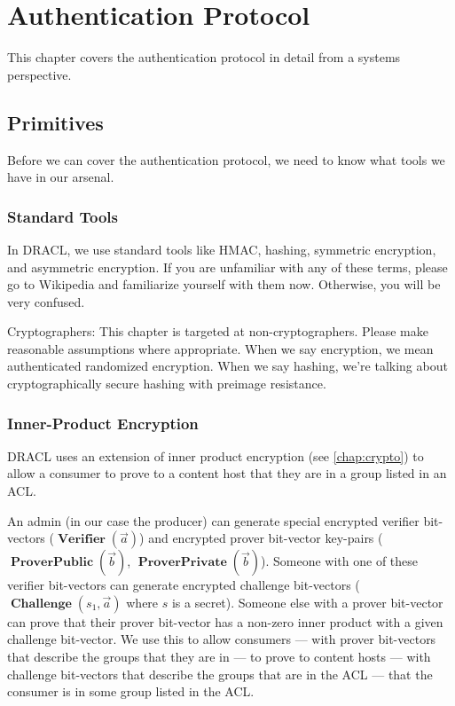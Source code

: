 \documentclass[pdftex,12pt,a4papaer,twoside,notitlepage]{report}
\DeclareMathOperator{\Vvec}{\mathbf{Verifier}}
\DeclareMathOperator{\PvecP}{\mathbf{ProverPublic}}
\DeclareMathOperator{\PvecS}{\mathbf{ProverPrivate}}
\DeclareMathOperator{\Cvec}{\mathbf{Challenge}}
\begin{document}
\chapter{Authentication Protocol}
\label{chap:auth}

\newcommand{\Vv}{\Vvec(\vec{a})}
\newcommand{\Cv}{\Cvec(s_1, \vec{a})}
\newcommand{\Pv}{\PvecP(\vec{b})}
\newcommand{\Sv}{\PvecS(\vec{b})}

This chapter covers the authentication protocol in detail from a systems
perspective.

\section{Primitives}

Before we can cover the authentication protocol, we need to know what tools we
have in our arsenal.

\subsection{Standard Tools}

In DRACL, we use standard tools like HMAC, hashing, symmetric encryption, and
asymmetric encryption. If you are unfamiliar with any of these terms, please go
to Wikipedia and familiarize yourself with them now. Otherwise, you will be very
confused.

Cryptographers: This chapter is targeted at non-cryptographers. Please make
reasonable assumptions where appropriate. When we say encryption, we mean
authenticated randomized encryption. When we say hashing, we're talking about
cryptographically secure hashing with preimage resistance.

\subsection{Inner-Product Encryption}

DRACL uses an extension of inner product encryption (see \cref{chap:crypto}) to
allow a consumer to prove to a content host that they are in a group listed in
an ACL.

An admin (in our case the producer) can generate special encrypted verifier
bit-vectors ($\Vv$) and encrypted prover bit-vector key-pairs ($\Pv$, $\Sv$).
Someone with one of these verifier bit-vectors can generate encrypted challenge
bit-vectors ($\Cv$ where $s$ is a secret). Someone else with a prover bit-vector
can prove that their prover bit-vector has a non-zero inner product with a given
challenge bit-vector. We use this to allow consumers --- with prover bit-vectors
that describe the groups that they are in --- to prove to content hosts --- with
challenge bit-vectors that describe the groups that are in the ACL --- that the
consumer is in some group listed in the ACL.
\end{document}
